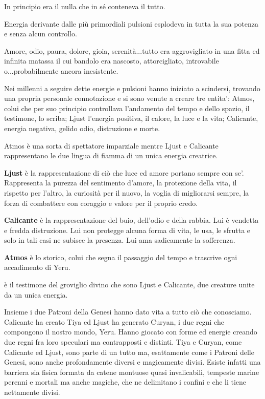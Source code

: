 \documentclass[a4paper,11pt,twoside,openany]{book}
\begin{document}
{\bigskip

In principio era il nulla che in sé conteneva il tutto.

Energia derivante dalle più primordiali pulsioni esplodeva in tutta la sua potenza e senza alcun controllo.

Amore, odio, paura, dolore, gioia, serenità...tutto era aggrovigliato in una fitta ed infinita matassa il cui bandolo era nascosto, attorcigliato, introvabile o...probabilmente ancora inesistente.

Nei millenni a seguire dette energie e pulsioni hanno iniziato a scindersi, trovando una propria personale connotazione e si sono venute a creare tre entita': Atmos, colui che per suo principio controllava l'andamento del tempo e dello spazio, il testimone, lo scriba; Ljust l'energia positiva, il calore, la luce e la vita; Calicante, energia negativa, gelido odio, distruzione e morte.

Atmos è una sorta di spettatore imparziale mentre Ljust e Calicante rappresentano le due lingua di fiamma di un unica energia creatrice.

\textbf{Ljust} è la rappresentazione di ciò che luce ed amore portano sempre con se'. Rappresenta la purezza del sentimento d'amore, la protezione della vita, il rispetto per l'altro, la curiosità per il nuovo, la voglia di migliorarsi sempre, la forza di combattere con coraggio e valore per il proprio credo.

\textbf{Calicante} è la rappresentazione del buio, dell'odio e della rabbia. Lui è vendetta e fredda distruzione. Lui non protegge alcuna forma di vita, le usa, le sfrutta e solo in tali casi ne subisce la presenza. Lui ama sadicamente la sofferenza. 
 
\textbf{Atmos} è lo storico, colui che segna il passaggio del tempo e trascrive ogni accadimento di Yeru.

è il testimone del groviglio divino che sono Ljust e Calicante, due creature unite da un unica energia.

Insieme i due Patroni della Genesi hanno dato vita a tutto ciò che conosciamo. Calicante ha creato Tiya ed Ljust ha generato Curyan, i due regni che compongono il nostro mondo, Yeru. Hanno giocato con forme ed energie creando due regni fra loro speculari ma contrapposti e distinti. Tiya e Curyan, come Calicante ed Ljust, sono parte di un tutto ma, esattamente come i Patroni delle Genesi, sono anche profondamente diversi e magicamente divisi. Esiste infatti una barriera sia fisica formata da catene montuose quasi invalicabili, tempeste marine perenni e mortali ma anche magiche, che ne delimitano i confini e che li tiene nettamente divisi.

}
\end{document}
